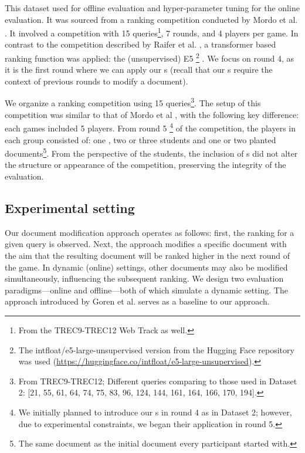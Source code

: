  This dataset used for offline evaluation and hyper-parameter tuning for the online evaluation. It was sourced from a ranking competition conducted by Mordo et al. \cite{div}. It involved a competition with 15 queries\footnote{From the TREC9-TREC12 Web Track as well.}, 7 rounds, and 4 players per game. In contrast to the competition described by Raifer et al. \cite{raifer2017information}, a transformer based ranking function was applied: the (unsupervised) E5 \footnote{The intfloat/e5-large-unsupervised version from the Hugging Face repository was used
  (\url{https://huggingface.co/intfloat/e5-large-unsupervised}).} \cite{wang2022text}. We focus on round 4, as it is the first round where we can apply our \bt s (recall that our \bt s require the context of previous rounds to modify a document).

 We organize a ranking competition using 15 queries\footnote{From TREC9-TREC12; Different queries comparing to those used in Dataset 2: [21, 55, 61, 64, 74, 75, 83, 96, 124, 144, 161, 164, 166, 170, 194].}. The setup of this competition was similar to that of Mordo et al \cite{div}, with the following key difference: each games included 5 players. From round 5 \footnote{We initially planned to introduce our \bt s in round 4 as in Dataset 2; however, due to experimental constraints, we began their application in round 5.} of the competition, the players in each group consisted of: one \bt, two or three students and one or two planted documents\footnote{The same document as the initial document every participant started with.}. From the perspective of the students, the inclusion of \bt s did not alter the structure or appearance of the competition, preserving the integrity of the evaluation.

\subsection{Experimental setting}\label{sec_exp_set}

Our document modification approach operates as follows: first, the ranking for a given query is observed. Next, the approach modifies a specific document with the aim that the resulting document will be ranked higher in the next round of the game. In dynamic (online) settings, other documents may also be modified simultaneously, influencing the subsequent ranking. We design two evaluation paradigms—online and offline—both of which simulate a dynamic setting. The approach introduced by Goren et al. \cite{goren2020ranking} serves as a baseline to our approach.

